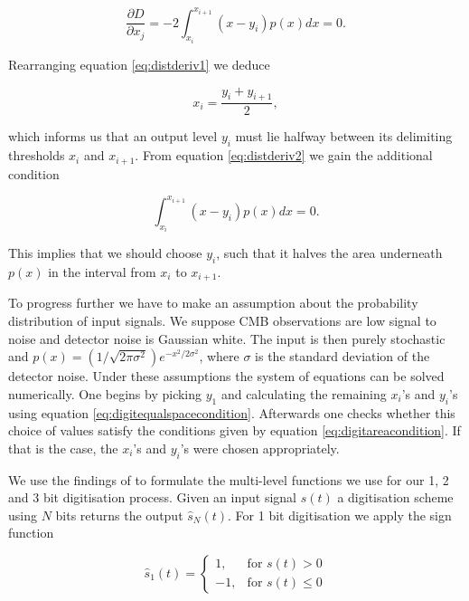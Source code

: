 \documentclass[apj]{emulateapj}
\begin{document}
\begin{equation} \label{eq:distderiv2}
\frac{\partial D}{\partial x_j} = -2 \int_{x_i}^{x_{i+1}} \left( x-y_i \right) p(x) dx = 0.
\end{equation}

Rearranging equation \ref{eq:distderiv1} we deduce

\begin{equation} \label{eq:digitequalspacecondition}
x_i = \frac{y_i+y_{i+1}}{2},
\end{equation}

which informs us that an output level $y_i$ must lie halfway between its delimiting thresholds $x_i$ and $x_{i+1}$. From equation \ref{eq:distderiv2} we gain the additional condition

\begin{equation} \label{eq:digitareacondition}
\int_{x_i}^{x_{i+1}} \left( x-y_i \right) p(x) dx = 0.
\end{equation}

This implies that we should choose $y_i$, such that it halves the area underneath $p(x)$ in the interval from $x_i$ to $x_{i+1}$.

To progress further we have to make an assumption about the probability distribution of input signals. We suppose CMB observations are low signal to noise and detector noise is Gaussian white. The input is then purely stochastic and  $p(x) = (1/\sqrt{2\pi\sigma^2}) e^{-x^2/2\sigma^2}$, where $\sigma$ is the standard deviation of the detector noise. Under these assumptions the system of equations can be solved numerically. One begins by picking $y_1$ and calculating the remaining $x_i$'s and $y_i$'s using equation \ref{eq:digitequalspacecondition}. Afterwards one checks whether this choice of values satisfy the conditions given by equation \ref{eq:digitareacondition}. If that is the case, the $x_i$'s and $y_i$'s were chosen appropriately.

We use the findings of \cite{max1960} to formulate the multi-level functions we use for our 1, 2 and 3 bit digitisation process. Given an input signal $s(t)$ a digitisation scheme using $N$ bits returns the output $\hat{s}_N(t)$. For 1 bit digitisation we apply the sign function

\begin{equation} \label{eq:1bit}
\hat{s}_1(t) = \left\{ \begin{array}{lr}
1, & \text{for } s(t) > 0\\
-1, & \text{for } s(t) \leq 0
\end{array} \right. \end{equation}
\end{document}
